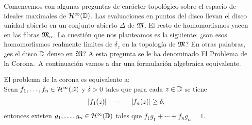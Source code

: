 Comencemos con algunas preguntas de carácter topológico sobre el espacio de ideales maximales de $\mathcal{H}^{\infty}(\mathbb{D})$. Las evaluaciones en puntos del disco llevan el disco unidad abierto en un conjunto abierto $\Delta$ de $\mathfrak{M}$. El resto de homomorfismos yacen en las fibras $\mathfrak{M}_\alpha$. La cuestión que nos planteamos es la siguiente: ¿son esos homomorfismos realmente límites de $\delta_z$ en la topología de $\mathfrak{M}$? En otras palabras, ¿es el disco $\mathbb{D}$ denso en $\mathfrak{M}$? A esta
pregunta se le ha denominado El Problema de la Corona. A continuación vamos a dar una formulación algebraica equivalente.\\

\begin{theorem}
    El problema de la corona es equivalente a: \\

    Sean $f_1, \dots, f_n \in \mathcal{H}^{\infty}(\mathbb{D})$ y $\delta > 0$ tales que para cada $z \in \mathbb{D}$ se tiene
\begin{equation*}
    \left\lvert f_1(z)\right\rvert + \cdots + \left\lvert f_n(z)\right\rvert \geq \delta,
\end{equation*}
     entonces existen $g_1, \dots, g_n \in \mathcal{H}^{\infty}(\mathbb{D})$ tales que $f_1 g_1 + \cdots + f_n g_n = 1$.

\end{theorem}

